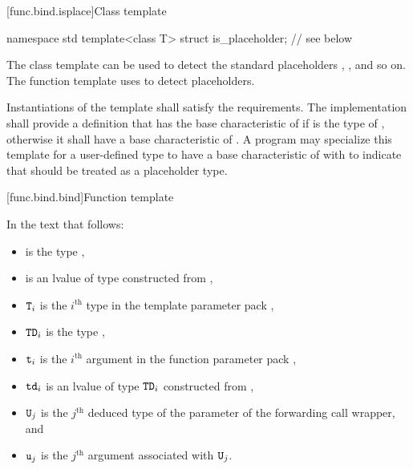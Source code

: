 [func.bind.isplace]{Class template }

%
\begin{codeblock}
namespace std {
  template<class T> struct is_placeholder;      // see below
}
\end{codeblock}

\pnum
The class template  can be used to detect the standard placeholders
, , and so on. The function template  uses
 to detect placeholders.

\pnum
Instantiations of the  template shall satisfy
the  requirements. The implementation
shall provide a definition that has the base characteristic of
 if  is the type of
, otherwise it shall have a
base characteristic of . A program
may specialize this template for a user-defined type  to
have a base characteristic of 
with  to indicate that  should be
treated as a placeholder type.

[func.bind.bind]{Function template }

\pnum
In the text that follows:

\begin{itemize}
\item {} is the type ,
\item {} is an lvalue of type  constructed from ,
\item $\texttt{T}_i$ is the $i^\text{th}$ type in the template parameter pack ,
\item $\texttt{TD}_i$ is the type ,
\item $\texttt{t}_i$ is the $i^\text{th}$ argument in the function parameter pack ,
\item $\texttt{td}_i$ is an lvalue of type $\texttt{TD}_i$ constructed from ,
\item $\texttt{U}_j$ is the $j^\text{th}$ deduced type of the  parameter
  of the forwarding call wrapper, and
\item $\texttt{u}_j$ is the $j^\text{th}$ argument associated with $\texttt{U}_j$.
\end{itemize}


